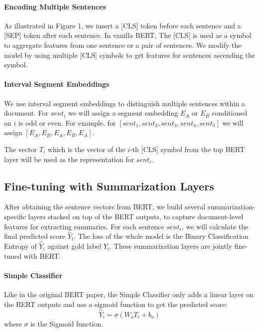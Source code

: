\documentclass[11pt,a4paper]{article}
\begin{document}
    \paragraph{Encoding Multiple Sentences} As illustrated in Figure 1, we insert a [CLS] token before each sentence and a [SEP] token after each sentence.
    In vanilla BERT, The      [CLS] is used as a symbol to aggregate features from one sentence or a pair of sentences. We modify the model by using multiple [CLS] symbols to get features for  sentences ascending the symbol.
    
    \paragraph{Interval Segment Embeddings}
    We use interval segment embeddings to distinguish multiple sentences within a document. For $sent_i$ we will assign a segment embedding $E_A$ or $E_B$ conditioned on $i$ is odd or even. For example, for  $[sent_1, sent_2, sent_3, sent_4, sent_5]$ we will assign $[E_A, E_B, E_A,E_B, E_A]$.
    
    The vector $T_i$ which is the vector of the $i$-th [CLS] symbol from the top BERT layer will be used as the representation for $sent_i$.
    
    
    \subsection{Fine-tuning with Summarization Layers}
    After obtaining the sentence vectors from BERT, we build several summarization-specific layers stacked on top of the BERT outputs, to capture document-level features for extracting summaries. 
    For each sentence $sent_i$, we will calculate the final predicted score $\hat{Y}_i$.
        The loss of the whole model is the Binary Classification Entropy of $\hat{Y}_i$ against gold label $Y_i$.
    These summarization layers  are jointly fine-tuned with BERT.

    
    \paragraph{Simple Classifier}
    Like in the original BERT paper, the Simple Classifier only adds a linear layer on the BERT outputs and use a sigmoid function to get the predicted score:
    \begin{equation}
    \hat{Y}_i = \sigma(W_oT_i+b_o)
    \end{equation}
    where $\sigma$ is the Sigmoid function.
    
\end{document}
